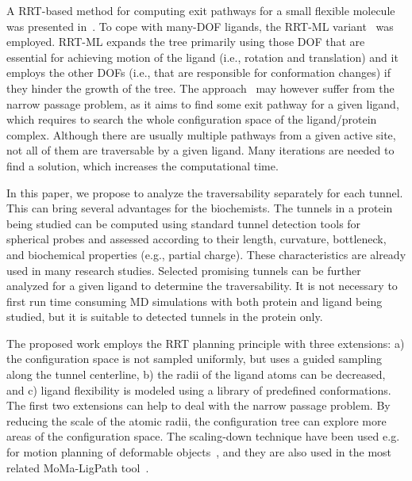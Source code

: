 \documentclass{svmult}
\begin{document}
A RRT-based method for computing exit pathways for a small flexible molecule was presented in~\cite{cortes2010simulating}.
To cope with many-DOF ligands, the RRT-ML variant~\cite{cortes2007mlrrt} was employed.
RRT-ML expands the tree primarily using those DOF that are essential for achieving motion of the ligand (i.e., rotation
and translation) and it employs the other DOFs (i.e., that are responsible for conformation changes) if they hinder the growth of the tree.
The approach~\cite{cortes2010simulating} may however suffer from the narrow passage problem, as it aims to find some exit pathway for a given ligand, which requires to search the whole configuration space of the ligand/protein complex.
Although there are usually multiple pathways from a given active site, not all of them are traversable by a given ligand.
Many iterations are needed to find a solution, which increases the computational time.

In this paper, we propose to analyze the traversability separately for each tunnel.
This can bring several advantages for the biochemists.
The tunnels in a protein being studied can be computed using standard tunnel detection tools for spherical probes and assessed
according to their length, curvature, bottleneck, and biochemical properties (e.g., partial charge).
These characteristics are already used in many research studies.
Selected promising tunnels can be further analyzed for a given ligand to determine the traversability.
It is not necessary to first run time consuming MD simulations with both protein and ligand being studied, but it is suitable
to detected tunnels in the protein only.

The proposed work employs the RRT planning principle with three extensions: 
a) the configuration space is not sampled uniformly, but uses a guided sampling along the tunnel centerline,
b) the radii of the ligand atoms can be decreased, and 
c) ligand flexibility is modeled using a library of predefined conformations.
The first two extensions can help to deal with the narrow passage problem.
By reducing the scale of the atomic radii, the configuration tree can explore more areas of the configuration space.
The scaling-down technique have been used e.g. for motion planning of deformable objects~\cite{gayle2005path,alterovitz2008motion}, and
they are also used in the most related MoMa-LigPath tool~\cite{cortes2005path}.
\end{document}
